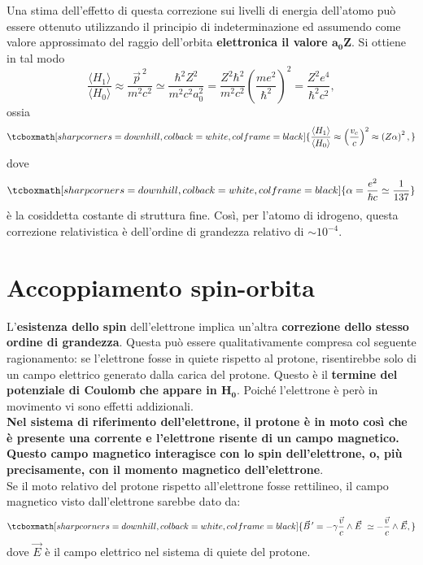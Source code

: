 Una stima dell'effetto di questa correzione sui livelli di energia dell'atomo può essere ottenuto utilizzando il principio di indeterminazione ed assumendo come valore approssimato del raggio dell'orbita \textbf{elettronica il valore $\boldsymbol{a_0 Z}$}. Si ottiene in tal modo
	\begin{equation} 
		\frac{\langle H_1 \rangle}{\langle H_0 \rangle} \approx \frac{\vec{p}^{\ 2}}{m^2c^2} \simeq \frac{\hbar^2 Z^2}{m^2c^2a_0^2}=\frac{Z^2 \hbar^2}{m^2c^2} \left( \frac{me^2}{\hbar^2}\right)^2=\frac{Z^2 e^4}{\hbar^2 c^2} ,
	\end{equation}
ossia
	\begin{equation}
		\tcboxmath[sharp corners=downhill, colback=white, colframe=black]{
			\frac{\langle H_1 \rangle}{\langle H_0 \rangle} \approx \left( \frac{v_e}{c} \right)^2 \approx \left(  Z \alpha \right)^2 ,
			}
	\end{equation}
dove
	\begin{equation} 
		\tcboxmath[sharp corners=downhill, colback=white, colframe=black]{
		\alpha=\frac{e^2}{\hbar c} \simeq \frac{1}{137}
		}
	\end{equation}
è la cosiddetta costante di struttura fine. Così, per l'atomo di idrogeno, questa correzione relativistica è dell'ordine di grandezza relativo di $\sim10^{-4}$.
\section{Accoppiamento spin-orbita}

L'\textbf{esistenza dello spin} dell'elettrone implica un'altra \textbf{correzione dello stesso ordine di grandezza}. Questa può essere qualitativamente compresa col seguente ragionamento: se l'elettrone fosse in quiete rispetto al protone, risentirebbe solo di un campo elettrico generato dalla carica del protone. Questo è il \textbf{termine del potenziale di Coulomb che appare in $\boldsymbol{H_0}$}. Poiché l'elettrone è però in movimento vi sono effetti addizionali. \\

\textbf{Nel sistema di riferimento dell'elettrone, il protone è in moto così che è presente una corrente e l'elettrone risente di un campo magnetico. Questo campo magnetico interagisce con lo spin dell'elettrone, o, più precisamente, con il momento magnetico dell'elettrone}. \\

Se il moto relativo del protone rispetto all'elettrone fosse rettilineo, il campo magnetico visto dall'elettrone sarebbe dato da:
	\begin{equation} 
		\tcboxmath[sharp corners=downhill, colback=white, colframe=black]{	
			\vec{B}^{\, \prime}=-\gamma \frac{\vec{v}}{c} \wedge \vec{E} \ \simeq -\frac{\vec{v}}{c} \wedge \vec{E} ,
			}
	\end{equation}
dove $\vec{E}$ è il campo elettrico nel sistema di quiete del protone. \\

